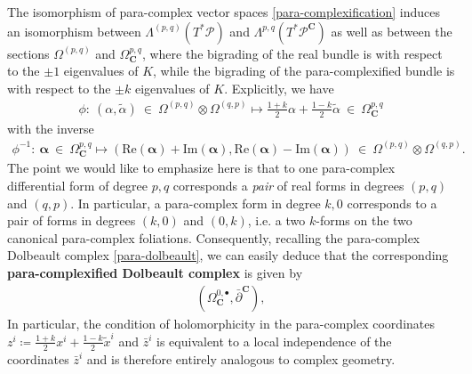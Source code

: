 \documentclass{article}
\newcommand{\PS}{\mathcal{P}}
\newcommand{\ap}{\alpha}
\newcommand{\p}{\partial}
\newcommand{\xt}{{\tilde{x}}}
\newcommand{\rd}{\mathrm{d}}
\def\tl{\tilde}
\newtheorem{lemma}[theorem]{Lemma}
\theoremstyle{definition}
\theoremstyle{remark}
\begin{document}
\newcommand{\Cp}{{\mathbf{C}}}
The isomorphism of para-complex vector spaces \eqref{para-complexification} induces an isomorphism between $\Lambda^{(p,q)}(T^*\PS)$ and $\Lambda^{p,q}(T^*\PS^\mathbf{C})$ as well as between the sections $\Omega^{(p,q)}$ and $\Omega_\Cp^{p,q}$, where the bigrading of the real bundle is with respect to the $\pm 1$ eigenvalues of $K$, while the bigrading of the para-complexified bundle is with respect to the $\pm k$ eigenvalues of $K$. Explicitly, we have
\begin{align}\label{isom_bigradings1}
\phi:\ (\ap,\tl{\ap})\ \in\ \Omega^{(p,q)}\otimes \Omega^{(q,p)}\longmapsto \frac{1+k}{2}\ap + \frac{1-k}{2}\tl{\ap}\ \in\ \Omega_\Cp^{p,q}
\end{align}
with the inverse
\begin{align}
\phi^{-1}:\ \bm{\ap}\ \in\ \Omega_\Cp^{p,q}\longmapsto (\text{Re}(\bm{\alpha})+\text{Im}(\bm{\ap}),\text{Re}(\bm{\alpha})-\text{Im}(\bm{\ap}))\ \in\ \Omega^{(p,q)}\otimes \Omega^{(q,p)}.
\end{align}
The point we would like to emphasize here is that to one para-complex differential form of degree $p,q$ corresponds a {\it pair} of real forms in degrees $(p,q)$ and $(q,p)$. In particular, a para-complex form in degree $k,0$ corresponds to a pair of forms in degrees $(k,0)$ and $(0,k)$, i.e. a two $k$-forms on the two canonical para-complex foliations. Consequently, recalling the para-complex Dolbeault complex \eqref{para-dolbeault}, we can easily deduce that the corresponding {\bf para-complexified Dolbeault complex} is given by
\begin{align}
\left( \Omega^{0,\bullet}_\Cp,\bar{\p}^\Cp\right),
\end{align}
In particular, the condition of holomorphicity in the para-complex coordinates $z^i\coloneqq \frac{1+k}{2}x^i+\frac{1-k}{2}\xt^i$ and $\bar{z}^i$ is equivalent to a local independence of the coordinates $\bar{z}^i$ and is therefore entirely analogous to complex geometry.
\end{document}
